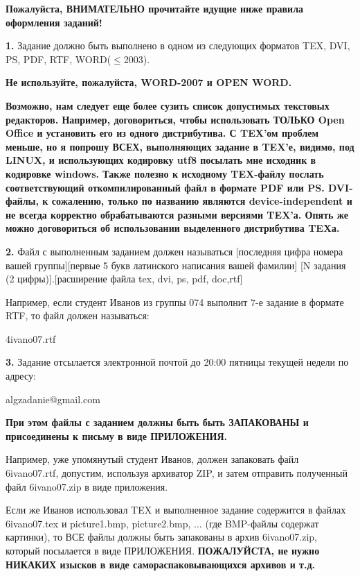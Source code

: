 \documentclass[10pt,twocolumn]{article}
\begin{document}
{{\bf Пожалуйста, {\large ВНИМАТЕЛЬНО} прочитайте идущие ниже правила оформления заданий!}

{\bf 1.} Задание должно быть выполнено в одном из следующих форматов 
TEX, DVI, PS, PDF, RTF, WORD($\leq$2003). 

{\huge {\bf
Не используйте, пожалуйста, WORD-2007 и OPEN WORD.}
}

{\bf Возможно, нам следует еще более сузить список допустимых текстовых редакторов.
Например, договориться, чтобы использовать ТОЛЬКО Open Office и установить его из одного дистрибутива.
С TEX'ом проблем меньше, но я попрошу ВСЕХ, выполняющих задание в TEX'е, видимо, под LINUX, 
и использующих кодировку utf8 посылать мне исходник в кодировке windows. Также полезно 
к исходному TEX-файлу послать соответствующий откомпилированный файл в формате PDF или PS. 
DVI-файлы, к сожалению,
только по названию являются device-independent и не всегда корректно обрабатываются разными версиями 
TEX'а. Опять же можно договориться об использовании выделенного дистрибутива TEXа.}

{\bf 2.} Файл с выполненным заданием должен называться 
[последняя цифра номера вашей группы][первые 5 букв латинского написания вашей фамилии]
[N задания (2 цифры)].[расширение файла tex, dvi, ps, pdf,
doc,rtf]

Например, если студент Иванов из группы  074 выполнит $7$-е задание в формате RTF, то файл должен
называться: 

4ivano07.rtf

{\bf 3.} Задание отсылается  электронной почтой до 20:00 пятницы текущей недели   по адресу:

algzadanie@gmail.com

{\bf При этом файлы с заданием должны быть 
быть ЗАПАКОВАНЫ и присоединены к письму  в виде ПРИЛОЖЕНИЯ. 

}

Например, уже упомянутый студент Иванов, должен запаковать файл 6ivano07.rtf, допустим, используя
архиватор ZIP, и затем отправить полученный файл 6ivano07.zip  в виде приложения.

Если же Иванов использовал TEX и выполненное задание содержится в файлах 
6ivano07.tex и picture1.bmp, picture2.bmp, $\dots$ (где BMP-файлы содержат картинки), то
ВСЕ файлы должны быть запакованы в архив 6ivano07.zip, который посылается в виде ПРИЛОЖЕНИЯ.
{\bf ПОЖАЛУЙСТА, не нужно НИКАКИХ изысков в виде самораспаковывающихся архивов и т.д.}

}
\end{document}
